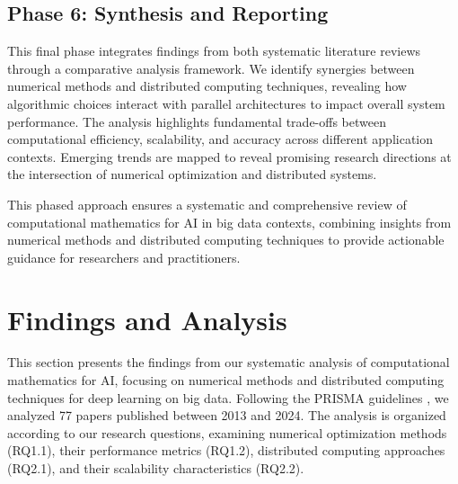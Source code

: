 \documentclass[acmsmall]{acmart}
\begin{document}







\subsection{Phase 6: Synthesis and Reporting}\label{subsec:phase-7-synthesis-and-reporting}

This final phase integrates findings from both systematic literature reviews through a comparative analysis framework. We identify synergies between numerical methods and distributed computing techniques, revealing how algorithmic choices interact with parallel architectures to impact overall system performance. The analysis highlights fundamental trade-offs between computational efficiency, scalability, and accuracy across different application contexts. Emerging trends are mapped to reveal promising research directions at the intersection of numerical optimization and distributed systems.

This phased approach ensures a systematic and comprehensive review of computational mathematics for AI in big data contexts, combining insights from numerical methods and distributed computing techniques to provide actionable guidance for researchers and practitioners.


\section{Findings and Analysis}\label{sec:findings-and-analysis}
This section presents the findings from our systematic analysis of computational mathematics for AI, focusing on numerical methods and distributed computing techniques for deep learning on big data. Following the PRISMA guidelines \citep{moher2009preferred}, we analyzed 77 papers published between 2013 and 2024. The analysis is organized according to our research questions, examining numerical optimization methods (RQ1.1), their performance metrics (RQ1.2), distributed computing approaches (RQ2.1), and their scalability characteristics (RQ2.2).
\end{document}
